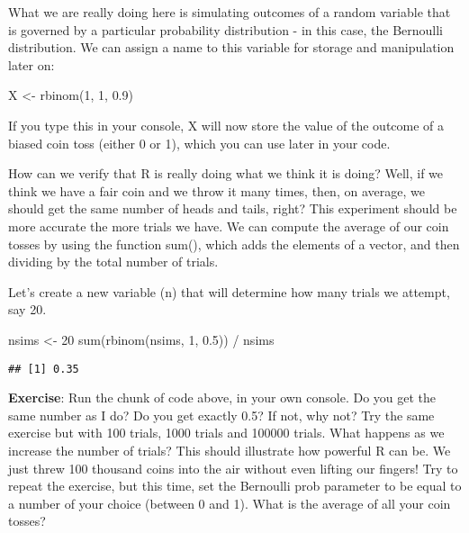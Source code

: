 \documentclass[
]{book}
\newenvironment{Shaded}{\begin{snugshade}}{\end{snugshade}}
\newcommand{\DecValTok}[1]{\textcolor[rgb]{0.00,0.00,0.81}{#1}}
\newcommand{\FloatTok}[1]{\textcolor[rgb]{0.00,0.00,0.81}{#1}}
\newcommand{\FunctionTok}[1]{\textcolor[rgb]{0.00,0.00,0.00}{#1}}
\newcommand{\NormalTok}[1]{#1}
\newcommand{\OtherTok}[1]{\textcolor[rgb]{0.56,0.35,0.01}{#1}}
\newcommand{\SpecialCharTok}[1]{\textcolor[rgb]{0.00,0.00,0.00}{#1}}
\begin{document}
What we are really doing here is simulating outcomes of a random variable that is governed by a particular probability distribution - in this case, the Bernoulli distribution. We can assign a name to this variable for storage and manipulation later on:

\begin{Shaded}
\begin{Highlighting}[]
\NormalTok{X }\OtherTok{\textless{}{-}} \FunctionTok{rbinom}\NormalTok{(}\DecValTok{1}\NormalTok{, }\DecValTok{1}\NormalTok{, }\FloatTok{0.9}\NormalTok{)}
\end{Highlighting}
\end{Shaded}

If you type this in your console, X will now store the value of the outcome of a biased coin toss (either 0 or 1), which you can use later in your code.

How can we verify that R is really doing what we think it is doing? Well, if we think we have a fair coin and we throw it many times, then, on average, we should get the same number of heads and tails, right? This experiment should be more accurate the more trials we have. We can compute the average of our coin tosses by using the function sum(), which adds the elements of a vector, and then dividing by the total number of trials.

Let's create a new variable (n) that will determine how many trials we attempt, say 20.

\begin{Shaded}
\begin{Highlighting}[]
\NormalTok{nsims }\OtherTok{\textless{}{-}} \DecValTok{20}
\FunctionTok{sum}\NormalTok{(}\FunctionTok{rbinom}\NormalTok{(nsims, }\DecValTok{1}\NormalTok{, }\FloatTok{0.5}\NormalTok{)) }\SpecialCharTok{/}\NormalTok{ nsims}
\end{Highlighting}
\end{Shaded}

\begin{verbatim}
## [1] 0.35
\end{verbatim}

\textbf{Exercise}: Run the chunk of code above, in your own console. Do you get the same number as I do? Do you get exactly 0.5? If not, why not? Try the same exercise but with 100 trials, 1000 trials and 100000 trials. What happens as we increase the number of trials? This should illustrate how powerful R can be. We just threw 100 thousand coins into the air without even lifting our fingers! Try to repeat the exercise, but this time, set the Bernoulli prob parameter to be equal to a number of your choice (between 0 and 1). What is the average of all your coin tosses?
\end{document}
